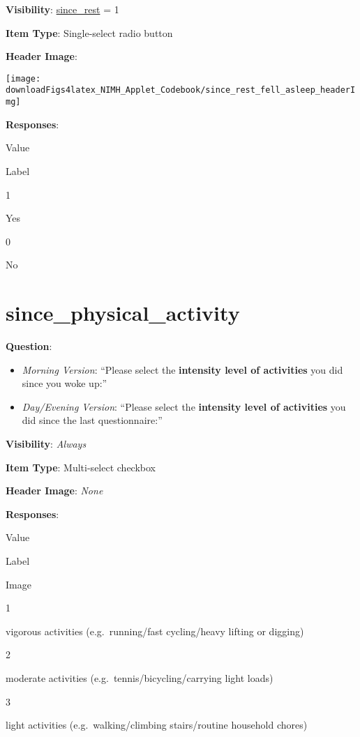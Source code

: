 \documentclass[]{book}
\providecommand{\tightlist}{%
  \setlength{\itemsep}{0pt}\setlength{\parskip}{0pt}}
\begin{document}
\textbf{Visibility}: \protect\hyperlink{since_rest}{since\_rest} = 1

\textbf{Item Type}: Single-select radio button

\textbf{Header Image}:

\begin{flushleft}\texttt{[image: downloadFigs4latex\_NIMH\_Applet\_Codebook/since\_rest\_fell\_asleep\_headerImg]} \end{flushleft}

\textbf{Responses}:

Value

Label

1

Yes

0

No

\hypertarget{since_physical_activity}{%
\section{since\_physical\_activity}\label{since_physical_activity}}

\textbf{Question}:

\begin{itemize}
\tightlist
\item
  \emph{Morning Version}: ``Please select the \textbf{intensity level of activities} you did since you woke up:''
\item
  \emph{Day/Evening Version}: ``Please select the \textbf{intensity level of activities} you did since the last questionnaire:''
\end{itemize}

\textbf{Visibility}: \emph{Always}

\textbf{Item Type}: Multi-select checkbox

\textbf{Header Image}: \emph{None}

\textbf{Responses}:

Value

Label

Image

1

vigorous activities (e.g.~running/fast cycling/heavy lifting or digging)

2

moderate activities (e.g.~tennis/bicycling/carrying light loads)

3

light activities (e.g.~walking/climbing stairs/routine household chores)
\end{document}
